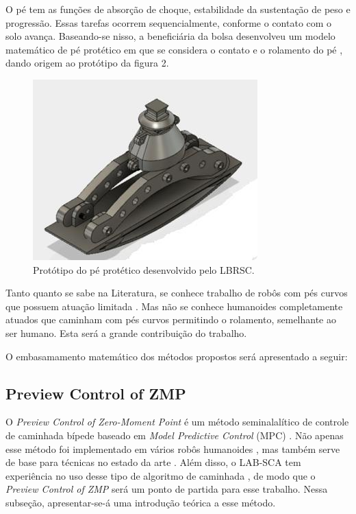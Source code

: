O pé tem as funções de absorção de choque, estabilidade da sustentação de peso e progressão. Essas tarefas ocorrem sequencialmente, conforme o contato com o solo avança. Baseando-se nisso, a beneficiária da bolsa  desenvolveu um modelo matemático de pé protético  em que se considera o contato e o rolamento do pé \cite{carol2018}, dando origem ao protótipo da figura 2.

\begin{figure}[!htb]
\centering
\includegraphics{protese}
\caption{Protótipo do pé protético desenvolvido pelo LBRSC.}
\label{Rotulo}
\end{figure}

Tanto quanto se sabe na Literatura, se conhece trabalho de robôs com pés curvos que possuem atuação limitada \cite{massachu}. Mas não se conhece humanoides completamente atuados que caminham com pés curvos permitindo o rolamento, semelhante ao ser humano. Esta será a grande contribuição do trabalho.

O embasamamento matemático dos métodos propostos será apresentado a seguir:


\subsection{Preview Control of ZMP}

O \emph{Preview Control of Zero-Moment Point} é um método seminalalítico de controle de caminhada bípede baseado em \emph{Model Predictive Control} (MPC) \cite{kajita2003}. Não apenas esse método foi implementado em vários robôs humanoides \cite{yi2016}, mas  também serve de base para técnicas no estado da arte \cite{tesemarcos,herdt2010}. Além disso, o LAB-SCA tem experiência no uso desse tipo de algoritmo de caminhada \cite{max22,tesemarcos}, de modo que o \emph{Preview Control of ZMP} será um ponto de partida para esse trabalho. Nessa subseção, apresentar-se-á uma introdução teórica a esse método.

